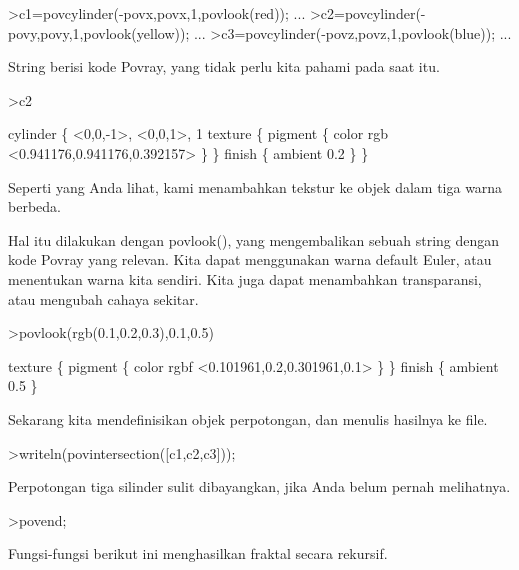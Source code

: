 \documentclass[12pt,arial,letterpaper]{book}
\begin{document}
\begin{eulernootebook}
\begin{eulercomment}
\begin{eulercomment}
\begin{eulernootebook}
\begin{eulercomment}
\begin{eulercomment}
\begin{eulercomment}
\begin{eulercomment}
\begin{eulercomment}
\begin{eulercomment}
\begin{eulercomment}
\begin{eulernotebook}
\begin{eulercomment}
\end{eulercomment}
\begin{eulerprompt}
>c1=povcylinder(-povx,povx,1,povlook(red)); ...
>c2=povcylinder(-povy,povy,1,povlook(yellow)); ...
>c3=povcylinder(-povz,povz,1,povlook(blue)); ...
\end{eulerprompt}
\begin{eulercomment}
String berisi kode Povray, yang tidak perlu kita pahami pada saat itu.
\end{eulercomment}
\begin{eulerprompt}
>c2
\end{eulerprompt}
\begin{euleroutput}
  cylinder \{ <0,0,-1>, <0,0,1>, 1
   texture \{ pigment \{ color rgb <0.941176,0.941176,0.392157> \}  \} 
   finish \{ ambient 0.2 \} 
   \}
\end{euleroutput}
\begin{eulercomment}
Seperti yang Anda lihat, kami menambahkan tekstur ke objek dalam tiga
warna berbeda.

Hal itu dilakukan dengan povlook(), yang mengembalikan sebuah string
dengan kode Povray yang relevan. Kita dapat menggunakan warna default
Euler, atau menentukan warna kita sendiri. Kita juga dapat menambahkan
transparansi, atau mengubah cahaya sekitar.
\end{eulercomment}
\begin{eulerprompt}
>povlook(rgb(0.1,0.2,0.3),0.1,0.5)
\end{eulerprompt}
\begin{euleroutput}
   texture \{ pigment \{ color rgbf <0.101961,0.2,0.301961,0.1> \}  \} 
   finish \{ ambient 0.5 \} 
  
\end{euleroutput}
\begin{eulercomment}
Sekarang kita mendefinisikan objek perpotongan, dan menulis hasilnya
ke file.
\end{eulercomment}
\begin{eulerprompt}
>writeln(povintersection([c1,c2,c3]));
\end{eulerprompt}
\begin{eulercomment}
Perpotongan tiga silinder sulit dibayangkan, jika Anda belum pernah
melihatnya.
\end{eulercomment}
\begin{eulerprompt}
>povend;
\end{eulerprompt}
\begin{eulercomment}
Fungsi-fungsi berikut ini menghasilkan fraktal secara rekursif.


\end{eulercomment}
\end{eulernotebook}
\end{eulercomment}
\end{eulercomment}
\end{eulercomment}
\end{eulercomment}
\end{eulercomment}
\end{eulercomment}
\end{eulercomment}
\end{eulernootebook}
\end{eulercomment}
\end{eulercomment}
\end{eulernootebook}
\end{document}
